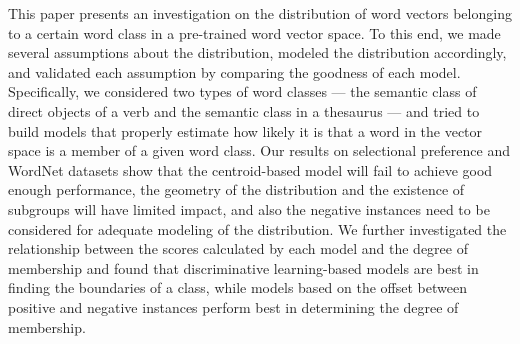 This paper presents an investigation on the distribution of word vectors belonging to a certain word class in a pre-trained word vector space. To this end, we made several assumptions about the distribution, modeled the distribution accordingly, and validated each assumption by comparing the goodness of each model. Specifically, we considered two types of word classes --- the semantic class of direct objects of a verb and the semantic class in a thesaurus --- and tried to build models that properly estimate how likely it is that a word in the vector space is a member of a given word class. Our results on selectional preference and WordNet datasets show that the centroid-based model will fail to achieve good enough performance, the geometry of the distribution and the existence of subgroups will have limited impact, and also the negative instances need to be considered for adequate modeling of the distribution.  We further investigated the relationship between the scores calculated by each model and the degree of membership and found that discriminative learning-based models are best in finding the boundaries of a class, while models based on the offset between positive and negative instances perform best in determining the degree of membership.

